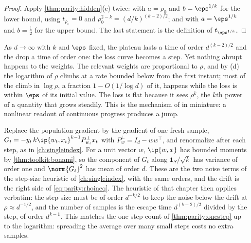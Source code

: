 \begin{refsection}

\begin{proof}
Apply \cref{thm:parity:hidden}(c) twice: with $a=\rho_0$ and $b=\eps^{1/k}$ for the lower bound, using $t_{\rho_0}=0$ and $\rho_0^{2-k}=(d/k)^{(k-2)/2}$; and with $a=\eps^{1/k}$ and $b=\frac12$ for the upper bound. The last statement is the definition of $t_{\eps^{1/k}}$.
\end{proof}

As $d\to\infty$ with $k$ and $\eps$ fixed, the plateau lasts a time of order $d^{(k-2)/2}$ and the drop a time of order one: the loss curve becomes a step. Yet nothing abrupt happens to the weights. The relevant weights are proportional to $\rho$, and by (d) the logarithm of $\rho$ climbs at a rate bounded below from the first instant; most of the climb in $\log\rho$, a fraction $1-O(1/\log d)$ of it, happens while the loss is within $\eps$ of its initial value. The loss is flat because it sees $\rho^k$, the $k$th power of a quantity that grows steadily. This is the mechanism of \textcite{SchaefferMirandaKoyejo2023} in miniature: a nonlinear readout of continuous progress produces a jump.

\begin{heuristic}
Replace the population gradient by the gradient of one fresh sample, $G_t=-y_t\,k\ip{w_t,x_t}^{k-1}P_{w_t}^\perp x_t$ with $P_w^\perp=I_d-ww^\top$, and renormalize after each step, as in \cref{ch:singleindex}. For a unit vector $w$, $\ip{w,x}$ has bounded moments by \cref{thm:toolkit:bonami}, so the component of $G_t$ along $\mathbf 1_S/\sqrt k$ has variance of order one and $\norm{G_t}^2$ has mean of order $d$. These are the two noise terms of the step-size heuristic of \cref{ch:singleindex}, with the same orders, and the drift is the right side of \eqref{eq:parity:rhoineq}. The heuristic of that chapter then applies verbatim: the step size must be of order $d^{-k/2}$ to keep the noise below the drift at $\rho\approx d^{-1/2}$, and the number of samples is the escape time $d^{(k-2)/2}$ divided by the step, of order $d^{k-1}$. This matches the one-step count of \cref{thm:parity:onestep} up to the logarithm: spreading the average over many small steps costs no extra samples.
\end{heuristic}


\end{refsection}
